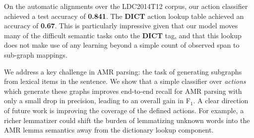 \documentclass[11pt]{article}
\newcommand\n[1]{\textit{#1}} %
\begin{document}


On the automatic alignments over the LDC2014T12 corpus,
  our action classifier achieved a test accuracy of \textbf{0.841}.
The \textbf{DICT} action lookup table achieved an accuracy of \textbf{0.67}.
This is particularly impressive given that our model moves many of the difficult 
  semantic tasks onto the \textbf{DICT} tag, and that this lookup does not make
  use of any learning beyond a simple count of observed span to sub-graph mappings.


We address a key challenge in AMR parsing: 
  the task of generating subgraphs from lexical items in the sentence.
We show that a 
  simple classifier over \textit{actions} which generate
  these graphs improves end-to-end recall for AMR parsing with only a small
  drop in precision, leading to an overall gain in F$_1$.
A clear direction of future work is improving the coverage of the defined actions.
For example, a richer lemmatizer could shift the burden of lemmatizing unknown
  words into the AMR lemma semantics away from the dictionary lookup component.
  

%
\end{document}
